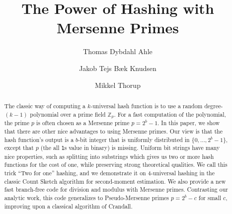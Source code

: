 \documentclass[11pt, a4paper]{article}
\title{The Power of Hashing with Mersenne Primes}
\author[1]{Thomas Dybdahl Ahle}
\author[2]{Jakob Tejs B\ae{}k Knudsen}
\author[2]{Mikkel Thorup}
\affil[1]{Facebook, BARC, \textit{thomas@ahle.dk}}
\affil[2]{University of Copenhagen, BARC, \textit {\{jakn, mthorup\}@di.ku}}
\begin{document}
\maketitle

\begin{abstract}
The classic way of computing a $k$-universal hash function is to use a random degree-$(k-1)$ polynomial over a prime field $\mathbb Z_p$.
For a fast computation of the polynomial, the prime $p$ is often chosen as a Mersenne prime $p=2^b-1$.
%
In this paper, we show that there are other nice advantages to using Mersenne primes.
Our view is that the hash function's output is a $b$-bit integer that is uniformly distributed in $\{0, \dots, 2^b-1\}$, except that $p$ (the all \texttt1s value in binary) is missing.
Uniform bit strings have many nice properties, such as splitting into substrings which gives us two or more hash functions for the cost of one, while preserving strong theoretical qualities.
We call this trick ``Two for one'' hashing, and we demonstrate it on 4-universal hashing in the classic Count Sketch algorithm for second-moment estimation.
%
We also provide a new fast branch-free code for division and modulus
with Mersenne primes. Contrasting our analytic work, this code
generalizes to Pseudo-Mersenne primes $p=2^b-c$ for small $c$,
improving upon a classical algorithm of Crandall.
\end{abstract}

\setcounter{tocdepth}{2}
\renewcommand{\contentsname}{}
\vspace{-3.5em}
\tableofcontents
\newpage







% 







\end{document}
